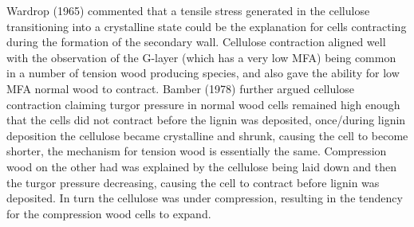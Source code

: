 Wardrop (1965) commented that a tensile stress generated in the cellulose
transitioning into a crystalline state could be the explanation for cells
contracting during the formation of the secondary wall. Cellulose contraction
aligned well with the observation of the G-layer (which has  a very low
MFA) being common in a number of tension wood producing species, and also gave
the ability for low MFA normal wood to contract. Bamber (1978) further argued
cellulose contraction claiming turgor pressure in normal wood cells remained
high enough that the cells did not contract before the lignin was deposited,
once/during lignin deposition the cellulose became crystalline and shrunk,
causing the cell to become shorter, the mechanism for tension wood is
essentially the same. Compression wood on the other had was explained by the
cellulose being laid down and then the turgor pressure decreasing, causing the
cell to contract before lignin was deposited. In turn the cellulose was under
compression, resulting in the tendency for the compression wood cells to
expand.